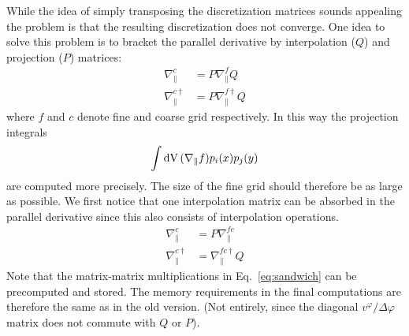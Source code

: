 While the idea of simply transposing the discretization matrices sounds appealing the problem
is that the resulting discretization does not converge.
One idea to solve this problem \cite{Stegmeir2017} is
to bracket the parallel derivative by interpolation ($Q$) and
projection ($P$) matrices:
\begin{align}
    \nabla^c_\parallel &= P\nabla_\parallel^f Q \\
    \nabla^{c\dagger}_\parallel &= P \nabla^{f\dagger}_\parallel Q
    \label{eq:sandwich}
\end{align}
where $f$ and $c$ denote fine and coarse grid respectively.
In this way the projection integrals
\begin{align*}
    \int\mathrm{dV}\, (\nabla_\parallel f) p_i(x)p_j(y)
    \label{}
\end{align*}
are computed more precisely.
The size of the fine grid should therefore be as large as
possible.
We first notice that one interpolation matrix can be absorbed
in the parallel derivative since this also consists of
interpolation operations.
\begin{align}
    \nabla^c_\parallel &= P\nabla_\parallel^{fc} \\
    \nabla^{c\dagger}_\parallel &= \nabla^{fc\dagger}_\parallel Q
    \label{eq:sandwich}
\end{align}
Note that the matrix-matrix multiplications in Eq.~\eqref{eq:sandwich} can
be precomputed and stored. The memory requirements
in the final computations are
therefore the same  as in the old version. (Not entirely, since
the diagonal $v^\varphi/\Delta \varphi$ matrix does not commute with $Q$ or $P$).



